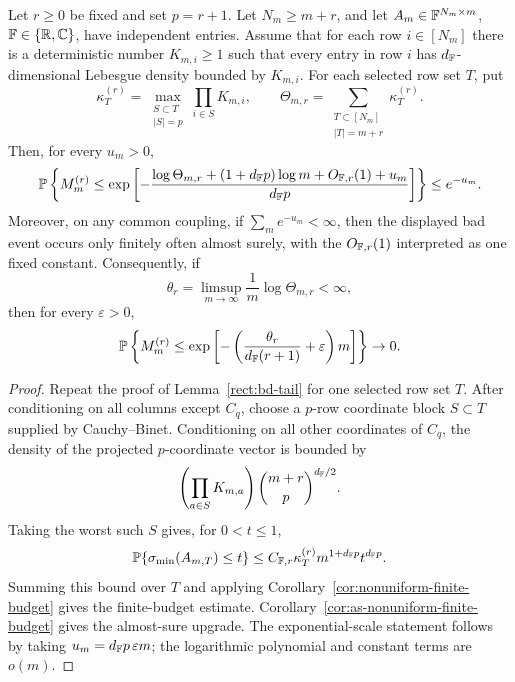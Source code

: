 \begin{corollary}\label{rect:heterogeneous-row-density}
Let \(r\ge0\) be fixed and set \(p=r+1\).  Let \(N_m\ge m+r\), and let
\(A_m\in\mathbb{F}^{N_m\times m}\), \(\mathbb{F}\in\{\mathbb{R},\mathbb{C}\}\), have independent entries.
Assume that for each row \(i\in[N_m]\) there is a deterministic number
\(K_{m,i}\ge1\) such that every entry in row \(i\) has \(d_{\mathbb{F}}\)-dimensional
Lebesgue density bounded by \(K_{m,i}\).  For each selected row set \(T\), put
\[
  \kappa_T^{(r)}
  =
  \max_{\substack{S\subset T\\ |S|=p}}\prod_{i\in S}K_{m,i},
  \qquad
  \Theta_{m,r}=\sum_{\substack{T\subset[N_m]\\ |T|=m+r}}\kappa_T^{(r)} .
\]
Then, for every \(u_m>0\),
\[
  \mathbb{P}\left\{
  M_m^{(r)}\le
  \exp\left[-\frac{\log\Theta_{m,r}+(1+d_{\mathbb{F}} p)\log m+O_{\mathbb{F},r}(1)+u_m}
  {d_{\mathbb{F}} p}\right]\right\}
  \le e^{-u_m}.
\]
Moreover, on any common coupling, if \(\sum_m e^{-u_m}<\infty\), then the
displayed bad event occurs only finitely often almost surely, with the
\(O_{\mathbb{F},r}(1)\) interpreted as one fixed constant.
Consequently, if
\[
  \theta_r=\limsup_{m\to\infty}\frac1m\log\Theta_{m,r}<\infty,
\]
then for every \(\varepsilon>0\),
\[
  \mathbb{P}\left\{
  M_m^{(r)}
  \le \exp\left[-\left(\frac{\theta_r}{d_{\mathbb{F}}(r+1)}+\varepsilon\right)m\right]
  \right\}\to0 .
\]
\end{corollary}

\begin{proof}
Repeat the proof of Lemma~\ref{rect:bd-tail} for one selected row set \(T\).
After conditioning on all columns except \(C_q\), choose a \(p\)-row coordinate
block \(S\subset T\) supplied by Cauchy--Binet.  Conditioning on all other
coordinates of \(C_q\), the density of the projected \(p\)-coordinate vector is
bounded by
\[
  \left(\prod_{a\in S}K_{m,a}\right)\binom{m+r}{p}^{d_{\mathbb{F}}/2}.
\]
Taking the worst such \(S\) gives, for \(0<t\le1\),
\[
  \mathbb{P}\{\sigma_{\min}(A_{m,T})\le t\}
  \le C_{\mathbb{F},r}\kappa_T^{(r)}m^{1+d_{\mathbb{F}} p}t^{d_{\mathbb{F}} p}.
\]
Summing this bound over \(T\) and applying
Corollary~\ref{cor:nonuniform-finite-budget} gives the finite-budget estimate.
Corollary~\ref{cor:as-nonuniform-finite-budget} gives the almost-sure upgrade.
The exponential-scale statement follows by taking \(u_m=d_{\mathbb{F}} p\,\varepsilon m\);
the logarithmic polynomial and constant terms are \(o(m)\).
\end{proof}

